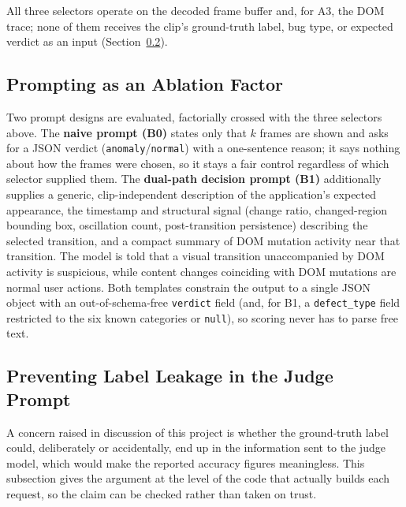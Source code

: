 All three selectors operate on the decoded frame buffer and, for A3, the DOM trace; none of them receives the clip's ground-truth label, bug type, or expected verdict as an input (Section~\ref{sec:label_leak}).

\subsection{Prompting as an Ablation Factor}
Two prompt designs are evaluated, factorially crossed with the three selectors above. The \textbf{naive prompt (B0)} states only that $k$ frames are shown and asks for a JSON verdict (\texttt{anomaly}/\texttt{normal}) with a one-sentence reason; it says nothing about how the frames were chosen, so it stays a fair control regardless of which selector supplied them. The \textbf{dual-path decision prompt (B1)} additionally supplies a generic, clip-independent description of the application's expected appearance, the timestamp and structural signal (change ratio, changed-region bounding box, oscillation count, post-transition persistence) describing the selected transition, and a compact summary of DOM mutation activity near that transition. The model is told that a visual transition unaccompanied by DOM activity is suspicious, while content changes coinciding with DOM mutations are normal user actions. Both templates constrain the output to a single JSON object with an out-of-schema-free \texttt{verdict} field (and, for B1, a \texttt{defect\_type} field restricted to the six known categories or \texttt{null}), so scoring never has to parse free text.

\subsection{Preventing Label Leakage in the Judge Prompt}
\label{sec:label_leak}
A concern raised in discussion of this project is whether the ground-truth label could, deliberately or accidentally, end up in the information sent to the judge model, which would make the reported accuracy figures meaningless. This subsection gives the argument at the level of the code that actually builds each request, so the claim can be checked rather than taken on trust.

